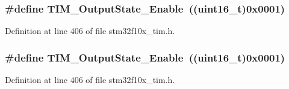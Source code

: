 \subsubsection[{\texorpdfstring{T\+I\+M\+\_\+\+Output\+State\+\_\+\+Enable}{TIM_OutputState_Enable}}]{\setlength{\rightskip}{0pt plus 5cm}\#define T\+I\+M\+\_\+\+Output\+State\+\_\+\+Enable~(({\bf uint16\+\_\+t})0x0001)}\hypertarget{group___t_i_m___output___compare__state_ga65afdda8761b6ac5ed0c0ad67c05dffe}{}\label{group___t_i_m___output___compare__state_ga65afdda8761b6ac5ed0c0ad67c05dffe}


Definition at line 406 of file stm32f10x\+\_\+tim.\+h.

\subsubsection[{\texorpdfstring{T\+I\+M\+\_\+\+Output\+State\+\_\+\+Enable}{TIM_OutputState_Enable}}]{\setlength{\rightskip}{0pt plus 5cm}\#define T\+I\+M\+\_\+\+Output\+State\+\_\+\+Enable~(({\bf uint16\+\_\+t})0x0001)}\hypertarget{group___t_i_m___output___compare__state_ga65afdda8761b6ac5ed0c0ad67c05dffe}{}\label{group___t_i_m___output___compare__state_ga65afdda8761b6ac5ed0c0ad67c05dffe}


Definition at line 406 of file stm32f10x\+\_\+tim.\+h.

